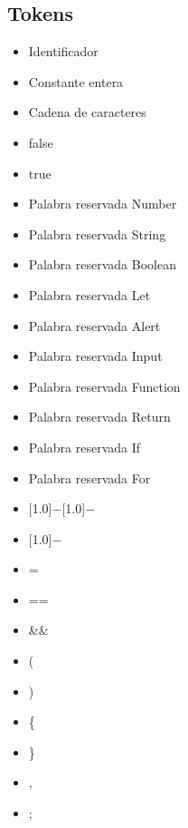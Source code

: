 \documentclass[11pt, , a4paper, titlepage]{article}
\newenvironment{myitemize}
{ \begin{itemize}
    \setlength{\itemsep}{0pt}
    \setlength{\parskip}{2pt}    }
{ \end{itemize}                  }
\newcommand{\minus}{\scalebox{0.75}[1.0]{$-$}}
\newenvironment{changemargin}[2]{%
\begin{list}{}{%
\setlength{\topsep}{0pt}%
\setlength{\leftmargin}{#1}%
\setlength{\rightmargin}{#2}%
\setlength{\listparindent}{\parindent}%
\setlength{\itemindent}{\parindent}%
\setlength{\parsep}{\parskip}%
}%
\item[]}{\end{list}}
\begin{document}
\begin{changemargin}{0cm}{+4cm}
    \subsection{Tokens}
    \begin{flushleft}
        \begin{myitemize}
            \item Identificador 
            \item Constante entera 
            \item Cadena de caracteres 
            \item false 
            \item true 
            \item Palabra reservada Number
            \item Palabra reservada String
            \item Palabra reservada Boolean
            \item Palabra reservada Let
            \item Palabra reservada Alert
            \item Palabra reservada Input
            \item Palabra reservada Function
            \item Palabra reservada Return 
            \item Palabra reservada If 
            \item Palabra reservada For
            \item \minus \minus {}
            \item \minus  {}
            \item =
            \item == 
            \item \&\& 
            \item ( 
                  \item ) 
            \item \{ 
            \item \} 
            \item , 
            \item ; 
        \end{myitemize}
    \end{flushleft}
\end{changemargin}
\clearpage
\end{document}
